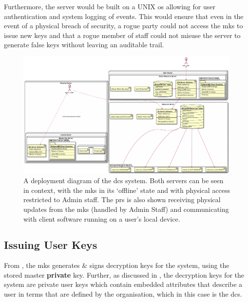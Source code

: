 Furthermore, the server would be built on a UNIX \acrshort{os} allowing for user authentication and system logging of events. This would ensure that even in the event of a physical breach of security, a rogue party could not access the \acrshort{mks} to issue new keys and that a rogue member of staff could not misuse the server to generate false keys without leaving an auditable trail.

\begin{figure}[htp]
    \includegraphics[width=\linewidth,keepaspectratio]{images/infrastructure/deployment.pdf}

    \caption{A deployment diagram of the \acrshort{dcs} \theResServer system. Both servers can be seen in context, with the \acrfull{mks} in its `offline' state and with physical access restricted to Admin staff. The \acrfull{prs} is also shown receiving physical updates from the \acrshort{mks} (handled by Admin Staff) and communicating with client software running on a user's local device.}

    \label{fig:deployment_diagram}
\end{figure}

\subsection{Issuing User Keys}
\label{subsec:analysis_deployment_iuk}

From , the \acrfull{mks} generates \& signs decryption keys for the \theResServer system, using the stored master \textbf{private} key. Further, as discussed in , the decryption keys for the system are private user keys which contain embedded attributes that describe a user in terms that are defined by the organisation, which in this case is the \acrshort{dcs}.


